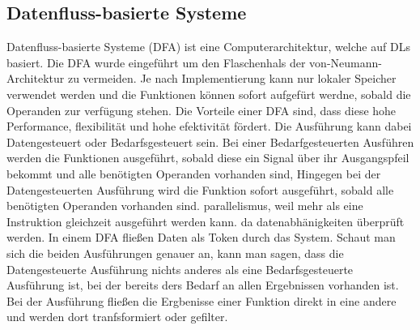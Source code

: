 \documentclass{article}
\begin{document}
    \subsection{Datenfluss-basierte Systeme}
    Datenfluss-basierte Systeme (DFA) ist eine Computerarchitektur, welche auf DLs basiert. 
    Die DFA wurde eingeführt um den Flaschenhals der von-Neumann-Architektur zu vermeiden. Je nach Implementierung kann nur lokaler Speicher verwendet werden und die Funktionen können sofort aufgefürt werdne, sobald die Operanden zur verfügung stehen. \cite{8}
    Die Vorteile einer DFA sind, dass diese hohe Performance, flexibilität und hohe efektivität fördert. \cite{1}
    Die Ausführung kann dabei Datengesteuert oder Bedarfsgesteuert sein. Bei einer Bedarfgesteuerten Ausführen werden die Funktionen ausgeführt, sobald diese ein Signal über ihr Ausgangspfeil bekommt und alle benötigten Operanden vorhanden sind, Hingegen bei der Datengesteuerten Ausführung wird die Funktion sofort ausgeführt, sobald alle benötigten Operanden vorhanden sind. \cite{2}
    parallelismus, weil mehr als eine Instruktion gleichzeit ausgeführt werden kann. da datenabhänigkeiten überprüft werden. 
    In einem DFA fließen Daten als Token durch das System.
    Schaut man sich die beiden Ausführungen genauer an, kann man sagen, dass die Datengesteuerte Ausführung nichts anderes als eine Bedarfsgesteuerte Ausführung ist, bei der bereits ders Bedarf an allen Ergebnissen vorhanden ist.\cite{11}
    Bei der Ausführung fließen die Ergbenisse einer Funktion direkt in eine andere und werden dort tranfsformiert oder gefilter. \cite{15}
    \newpage
\end{document}
